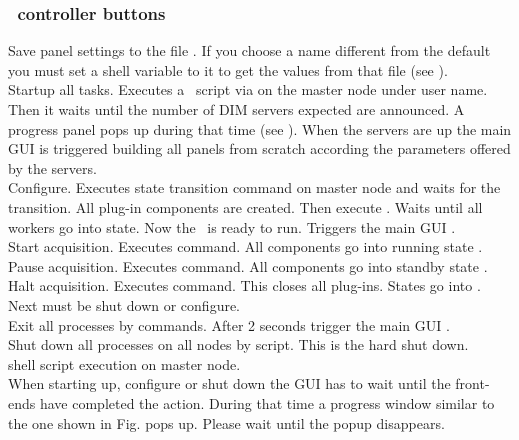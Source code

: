 {\subsubsection[DABC controller buttons]{\dabc\ controller buttons}
 Save panel settings to the file .
If you choose a name different from the default you must
set a shell variable to it to get the values from that file
(see ).\\
 Startup all tasks. Executes a \dabc\ script  via  
on the master node under user name. Then it waits until the number of DIM servers
expected are announced. A progress panel pops up during that time
(see ).
When the servers are up the main GUI  is triggered building
all panels from scratch according the parameters offered by the servers.\\
 Configure. Executes state transition command 
on master node and waits for the transition.
All plug-in components are created. Then execute .
Waits until all workers go into  state. Now the \dabc\ is ready to run.
Triggers the main GUI .\\
 Start acquisition. Executes  command.
All components go into running state .\\
 Pause acquisition. Executes  command.
All components go into standby state .\\
 Halt acquisition. Executes  command.
This closes all plug-ins. States go into . Next must be
shut down or configure.\\
 Exit all processes by  commands. After 2 seconds 
trigger the main GUI .\\
 Shut down all processes on all nodes by script. This is the hard shut down.\\
  shell script execution on master node.\\

When starting up, configure or shut down the GUI has to wait
until the front-ends have completed the action.
During that time a progress window similar to the one shown
in Fig.  pops up.
Please wait until the popup disappears.

}
